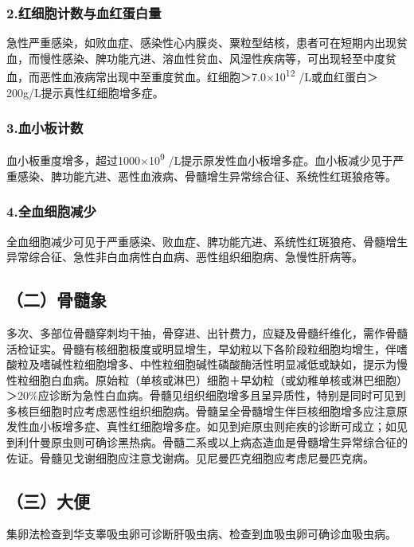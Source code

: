 \subsubsection{2.红细胞计数与血红蛋白量}

急性严重感染，如败血症、感染性心内膜炎、粟粒型结核，患者可在短期内出现贫血，而慢性感染、脾功能亢进、溶血性贫血、风湿性疾病等，可出现轻至中度贫血，而恶性血液病常出现中至重度贫血。红细胞＞7.0×10\textsuperscript{12}
/L或血红蛋白＞200g/L提示真性红细胞增多症。

\subsubsection{3.血小板计数}

血小板重度增多，超过1000×10\textsuperscript{9}
/L提示原发性血小板增多症。血小板减少见于严重感染、脾功能亢进、恶性血液病、骨髓增生异常综合征、系统性红斑狼疮等。

\subsubsection{4.全血细胞减少}

全血细胞减少可见于严重感染、败血症、脾功能亢进、系统性红斑狼疮、骨髓增生异常综合征、急性非白血病性白血病、恶性组织细胞病、急慢性肝病等。

\subsection{（二）骨髓象}

多次、多部位骨髓穿刺均干抽，骨穿进、出针费力，应疑及骨髓纤维化，需作骨髓活检证实。骨髓有核细胞极度或明显增生，早幼粒以下各阶段粒细胞均增生，伴嗜酸粒及嗜碱性粒细胞增多、中性粒细胞碱性磷酸酶活性明显减低或缺如，提示为慢性粒细胞白血病。原始粒（单核或淋巴）细胞＋早幼粒（或幼稚单核或淋巴细胞）＞20\%应诊断为急性白血病。骨髓见组织细胞增多且呈异质性，特别是同时可见到多核巨细胞时应考虑恶性组织细胞病。骨髓呈全骨髓增生伴巨核细胞增多应注意原发性血小板增多症、真性红细胞增多症。如见到疟原虫则疟疾的诊断可成立；如见到利什曼原虫则可确诊黑热病。骨髓二系或以上病态造血是骨髓增生异常综合征的佐证。骨髓见戈谢细胞应注意戈谢病。见尼曼匹克细胞应考虑尼曼匹克病。

\subsection{（三）大便}

集卵法检查到华支睾吸虫卵可诊断肝吸虫病、检查到血吸虫卵可确诊血吸虫病。

